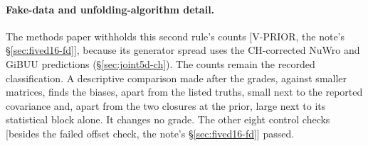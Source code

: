 \paragraph{Fake-data and unfolding-algorithm detail.} The methods paper withholds this second rule's counts [V-PRIOR, the note's \S\ref{sec:fived16-fd}], because its generator spread uses the CH-corrected NuWro and GiBUU predictions (\S\ref{sec:joint5d-ch}). The counts remain the recorded classification. A descriptive comparison made after the grades, against smaller matrices, finds the biases, apart from the listed truths, small next to the reported covariance and, apart from the two closures at the prior, large next to its statistical block alone. It changes no grade. The other eight control checks [besides the failed offset check, the note's \S\ref{sec:fived16-fd}] passed.
